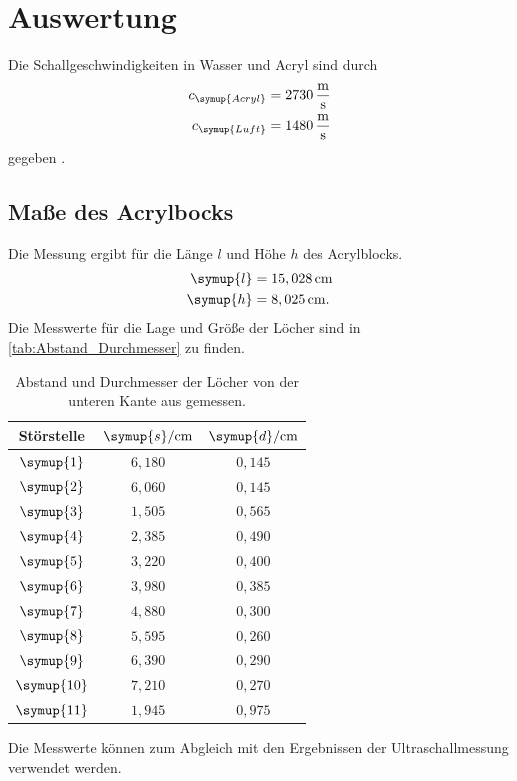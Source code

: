 \section{Auswertung}
\label{sec:Auswertung}
Die Schallgeschwindigkeiten in Wasser und Acryl sind durch
\begin{align*}
  c_{\symup{Acryl}} &= 2730\,\unit{\meter\per\second}\\
  c_{\symup{Luft}}  &= 1480\,\unit{\meter\per\second}
\end{align*}
gegeben \cite{schallgeschwindigkeit}.

\subsection{Maße des Acrylbocks}
Die Messung ergibt für die Länge $l$ und Höhe $h$ des Acrylblocks.
\begin{align*}
  \symup{l} &= 15,028\,\unit{\centi\meter}\\
  \symup{h} &= 8,025\,\unit{\centi\meter}.
\end{align*}
Die Messwerte für die Lage und Größe der Löcher sind in \autoref{tab:Abstand_Durchmesser} zu finden.
\begin{table}
  \centering
  \begin{tabular}{c c c}
    \toprule
    Störstelle & $\symup{s}/\unit{\centi\meter}$ & $\symup{d}/\unit{\centi\meter}$\\
    \midrule
    $\symup{1}  $ & $6,180$ & $0,145$ \\
    $\symup{2}  $ & $6,060$ & $0,145$ \\
    $\symup{3}  $ & $1,505$ & $0,565$ \\
    $\symup{4}  $ & $2,385$ & $0,490$ \\
    $\symup{5}  $ & $3,220$ & $0,400$ \\
    $\symup{6}  $ & $3,980$ & $0,385$ \\
    $\symup{7}  $ & $4,880$ & $0,300$ \\
    $\symup{8}  $ & $5,595$ & $0,260$ \\
    $\symup{9}  $ & $6,390$ & $0,290$ \\
    $\symup{10} $ & $7,210$ & $0,270$ \\
    $\symup{11} $ & $1,945$ & $0,975$ \\
    \bottomrule
  \end{tabular}
  \caption{Abstand und Durchmesser der Löcher von der unteren Kante aus gemessen.}
  \label{tab:Abstand_Durchmesser}
\end{table}
Die Messwerte können zum Abgleich mit den Ergebnissen der Ultraschallmessung verwendet werden.

